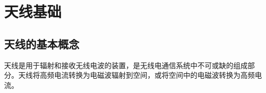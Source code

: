 
\chapter{天线基础}
\label{chap:antenna_fundamentals}

\section{天线的基本概念}
\label{sec:antenna_concept}

天线是用于辐射和接收无线电波的装置，是无线电通信系统中不可或缺的组成部分。天线将高频电流转换为电磁波辐射到空间，或将空间中的电磁波转换为高频电流。

